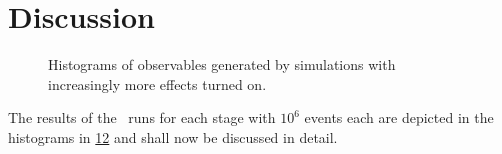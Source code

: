 \section{Discussion}%
\label{sec:disco}
\begin{figure}[ht]
  \centering
  \begin{subfigure}[t]{.49\textwidth}
    \caption{\label{fig:disc-xs}}
  \end{subfigure}
  \begin{subfigure}[t]{.49\textwidth}
    \caption{\label{fig:disc-cos_theta}}
  \end{subfigure}
  \begin{subfigure}[t]{.49\textwidth}
    \caption{\label{fig:disc-eta}}
  \end{subfigure}
  \begin{subfigure}[t]{.49\textwidth}
    \caption{\label{fig:disc-total_pT}}
  \end{subfigure}
  \begin{subfigure}[t]{.49\textwidth}
    \caption{\label{fig:disc-inv_m}}
  \end{subfigure}
  \begin{subfigure}[t]{.49\textwidth}
    \caption{\label{fig:disc-o_angle}}
  \end{subfigure}
\end{figure}
%
\begin{figure}[t]
  \centering \ContinuedFloat
  \begin{subfigure}[t]{.49\textwidth}
    \caption{\label{fig:disc-o_angle_cs}}
  \end{subfigure}
  \begin{subfigure}[t]{.49\textwidth}
    \caption{\label{fig:disc-pT}}
  \end{subfigure}
  \begin{subfigure}[t]{.49\textwidth}
    \caption{\label{fig:disc-pT_subl}}
  \end{subfigure}
  \begin{subfigure}[t]{.49\textwidth}
    \caption{\label{fig:disc-azimuthal_angle}}
  \end{subfigure}

  \caption{\label{fig:holhistos} Histograms of observables generated
    by simulations with increasingly more effects turned on.}
\end{figure}
%
The results of the \sherpa\ runs for each stage with \(10^6\) events
each are depicted in the histograms in \cref{fig:holhistos} and shall
now be discussed in detail.

